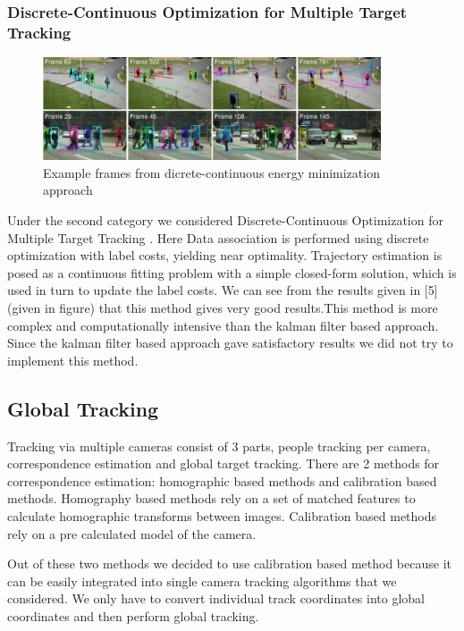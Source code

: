 \documentclass[12pt,a4paper]{report}
\begin{document}
\subsubsection{\large Discrete-Continuous Optimization for Multiple Target Tracking}
\begin{figure}[H]
\includegraphics[width=10cm]{multi_peo.png}
\centering
\caption{Example frames from dicrete-continuous energy minimization approach \cite{5}}
\label{multi_peo}
\end{figure}
Under the second category we considered Discrete-Continuous Optimization for Multiple Target Tracking \cite{5}. Here Data association is performed using discrete optimization with label costs, yielding near optimality. Trajectory estimation is posed as a continuous fitting problem with a simple closed-form solution, which is used in turn to update the label costs. We can see from the results given in [5] (given in figure) that this method gives very good results.This method is more complex and computationally intensive than the kalman filter based approach. Since the kalman filter based approach gave satisfactory results we did not try to implement this method.

\subsection{Global Tracking}
Tracking via multiple cameras consist of 3 parts, people tracking per camera, correspondence estimation and global target tracking. There are 2 methods for correspondence estimation: homographic based methods and calibration based methods. Homography based methods rely on a set of matched features to calculate homographic transforms between images. Calibration based methods rely on a pre calculated model of the camera.
\par Out of these two methods we decided to use calibration based method because it can be easily integrated into single camera tracking algorithms that we considered. We only have to convert individual track coordinates into global coordinates and then perform global tracking.
\end{document}

